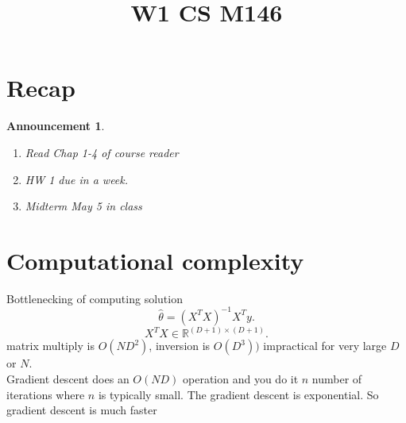 \documentclass[a4paper,12pt]{scrartcl} %
\theoremstyle{darktheorem}
\newtheorem{announcement}[theorem]{Announcement}
\begin{document}
\title{\color{sectioncolor}W1 CS M146}
\author{}
\date{}
\maketitle

\thispagestyle{fancy}
\section{Recap}
\begin{announcement}
    \begin{enumerate}
        \item Read Chap 1-4 of course reader
        \item HW 1 due in a week.
        \item Midterm May 5 in class
    \end{enumerate}
\end{announcement}
\section{Computational complexity}
Bottlenecking of computing solution
\[
\hat \theta = (X^{T}X)^{-1}X^{T}y
.\] 
\[
X^{T}X \in \mathbb{R}^{(D+1)\times (D+1)}
.\] 
matrix multiply is $O(ND^2)$, inversion is $O(D^{3}))$ impractical for very large $D$ or $N$.\\
Gradient descent does an $O(ND)$ operation and you do it $n$ number of iterations where $n$ is typically small. The
gradient descent is exponential. So gradient descent is much faster
\end{document}
